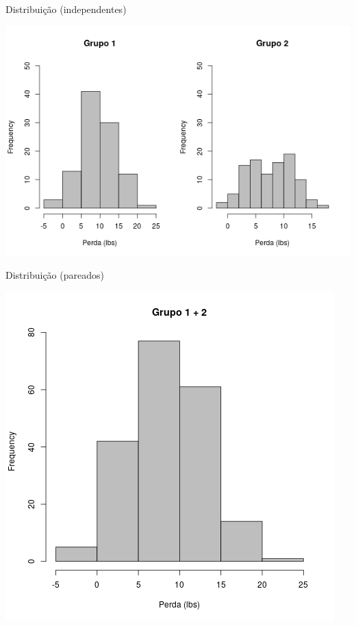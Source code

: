\documentclass{beamer}
\begin{document}
\begin{frame}{Distribuição (independentes)}
  \begin{center}
    \includegraphics[height=\textheight]{Cap23-25/obesidade-hist2}
  \end{center}
\end{frame}

\begin{frame}{Distribuição (pareados)}
  \begin{center}
    \includegraphics[height=\textheight]{Cap23-25/obesidade-hist1}
  \end{center}
\end{frame}
\end{document}
